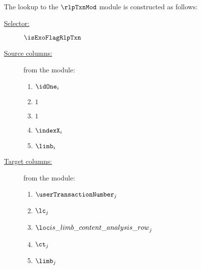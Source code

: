 
The lookup to the $\rlpTxnMod$ module is constructed as follows:
\begin{description}
	\item[\underline{Selector:}] $\isExoFlagRlpTxn$
	\item[\underline{Source columns:}] from the \mmioMod{} module:
		\begin{multicols}{3}
			\begin{enumerate}
				\item $\idOne  _{i}$
				\item $1$
				\item $1$
				\item $\indexX _{i}$
				\item $\limb   _{i}$
			\end{enumerate}
		\end{multicols}
	\item[\underline{Target columns:}] from the \rlpTxnMod{} module: 
		\begin{multicols}{3}
			\begin{enumerate}
				\item $\userTransactionNumber       _{j}$
				\item $\lc                          _{j}$
				\item $\locIsLimbContentAnalysisRow _{j}$
				\item $\ct                          _{j}$
				\item $\limb                        _{j}$
			\end{enumerate}
		\end{multicols}
\end{description}
